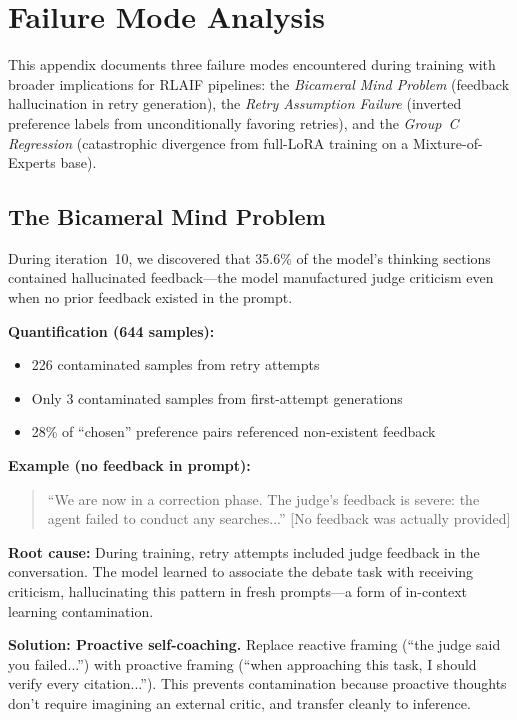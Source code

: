\section{Failure Mode Analysis}
\label{app:failure_modes}

This appendix documents three failure modes encountered during training with
broader implications for RLAIF pipelines: the \emph{Bicameral Mind Problem}
(feedback hallucination in retry generation), the \emph{Retry Assumption
Failure} (inverted preference labels from unconditionally favoring retries),
and the \emph{Group~C Regression} (catastrophic divergence from full-LoRA
training on a Mixture-of-Experts base).

\subsection{The Bicameral Mind Problem}

During iteration~10, we discovered that 35.6\% of the model's thinking
sections contained hallucinated feedback---the model manufactured judge
criticism even when no prior feedback existed in the prompt.

\textbf{Quantification (644 samples):}
\begin{itemize}
    \item 226 contaminated samples from retry attempts
    \item Only 3 contaminated samples from first-attempt generations
    \item 28\% of ``chosen'' preference pairs referenced non-existent feedback
\end{itemize}

\textbf{Example (no feedback in prompt):}
\begin{quote}
\small
``We are now in a correction phase. The judge's feedback is severe: the
agent failed to conduct any searches...'' [No feedback was actually provided]
\end{quote}

\textbf{Root cause:} During training, retry attempts included judge feedback
in the conversation. The model learned to associate the debate task with
receiving criticism, hallucinating this pattern in fresh prompts---a form
of in-context learning contamination.

\textbf{Solution: Proactive self-coaching.} Replace reactive framing
(``the judge said you failed...'') with proactive framing (``when
approaching this task, I should verify every citation...'').
This prevents contamination because proactive thoughts don't require
imagining an external critic, and transfer cleanly to inference.

